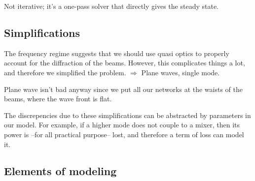 \documentclass[a4paper,11pt]{article}
\begin{document}
Not iterative; it's a one-pass solver that directly gives the steady state.


\subsection{Simplifications}

The frequency regime suggests that we should use quasi optics to properly account for the diffraction of the beams.
However, this complicates things a lot, and therefore we simplified the problem.
$\Rightarrow$ Plane waves, single mode.

Plane wave isn't bad anyway since we put all our networks at the waists of the beams, where the wave front is flat.

The discrepencies due to these simplifications can be abstracted by parameters in our model.
For example, if a higher mode does not couple to a mixer, then its power is --for all practical purpose-- lost, and therefore a term of loss can model it.


\subsection{Elements of modeling}
\end{document}
